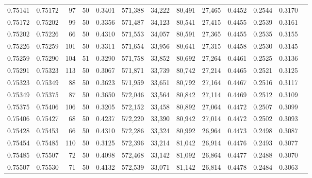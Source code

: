 \begin{tabular}{rrrrrrrrrrrrr}
0.75141 & 0.75172 &    97 &  50 &                                     0.3401 & 571,388 &  34,222 &  80,491 &  27,465 & 0.4452 & 0.2544 & 0.3170 \\
0.75172 & 0.75202 &    99 &  50 &                                     0.3356 & 571,487 &  34,123 &  80,541 &  27,415 & 0.4455 & 0.2539 & 0.3161 \\
0.75202 & 0.75226 &    66 &  50 &                                     0.4310 & 571,553 &  34,057 &  80,591 &  27,365 & 0.4455 & 0.2535 & 0.3155 \\
0.75226 & 0.75259 &   101 &  50 &                                     0.3311 & 571,654 &  33,956 &  80,641 &  27,315 & 0.4458 & 0.2530 & 0.3145 \\
0.75259 & 0.75290 &   104 &  51 &                                     0.3290 & 571,758 &  33,852 &  80,692 &  27,264 & 0.4461 & 0.2525 & 0.3136 \\
0.75291 & 0.75323 &   113 &  50 &                                     0.3067 & 571,871 &  33,739 &  80,742 &  27,214 & 0.4465 & 0.2521 & 0.3125 \\
0.75323 & 0.75349 &    88 &  50 &                                     0.3623 & 571,959 &  33,651 &  80,792 &  27,164 & 0.4467 & 0.2516 & 0.3117 \\
0.75349 & 0.75375 &    87 &  50 &                                     0.3650 & 572,046 &  33,564 &  80,842 &  27,114 & 0.4469 & 0.2512 & 0.3109 \\
0.75375 & 0.75406 &   106 &  50 &                                     0.3205 & 572,152 &  33,458 &  80,892 &  27,064 & 0.4472 & 0.2507 & 0.3099 \\
0.75406 & 0.75427 &    68 &  50 &                                     0.4237 & 572,220 &  33,390 &  80,942 &  27,014 & 0.4472 & 0.2502 & 0.3093 \\
0.75428 & 0.75453 &    66 &  50 &                                     0.4310 & 572,286 &  33,324 &  80,992 &  26,964 & 0.4473 & 0.2498 & 0.3087 \\
0.75454 & 0.75485 &   110 &  50 &                                     0.3125 & 572,396 &  33,214 &  81,042 &  26,914 & 0.4476 & 0.2493 & 0.3077 \\
0.75485 & 0.75507 &    72 &  50 &                                     0.4098 & 572,468 &  33,142 &  81,092 &  26,864 & 0.4477 & 0.2488 & 0.3070 \\
0.75507 & 0.75530 &    71 &  50 &                                     0.4132 & 572,539 &  33,071 &  81,142 &  26,814 & 0.4478 & 0.2484 & 0.3063 \\

\end{tabular}
